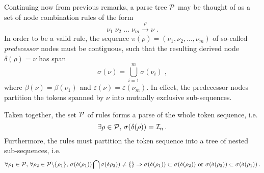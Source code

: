 \documentclass{report}
\begin{document}
Continuing now from previous remarks, a parse tree ${\cal P}$ may be 
thought of as a set of node combination rules of the form
\[
\nu_1\;\nu_2\;...\;\nu_m \stackrel{\rho}{\rightarrow} \nu\;.
\]
In order to be a valid rule, 
the sequence ${\pi}(\rho)=(\nu_1,\nu_2,...,\nu_m)$ of 
so-called {\em predecessor} nodes must be contiguous, such that the 
resulting derived node $\delta(\rho)=\nu$ has span
\[
\sigma(\nu)=\bigcup_{i=1}^{m}\sigma(\nu_i)\;,
\]
where $\beta(\nu)=\beta(\nu_1)$ and 
$\varepsilon(\nu)=\varepsilon(\nu_m)$.
In effect, the predecessor nodes partition the 
tokens spanned by $\nu$ into mutually exclusive sub-sequences.

Taken together, the set ${\cal P}$ of rules forms a parse
of the whole token sequence, i.e.
\[
\exists\rho\in{\cal P},\,\sigma(\delta(\rho)) = {\cal I}_n\,.
\]
Furthermore, the rules must
partition the token sequence into a tree of nested sub-sequences, i.e. 
\[
\forall \rho_1\in{\cal P},\,
\forall \rho_2\in{\cal P}\backslash\{\rho_1\}
,\,
\sigma(\delta(\rho_1))\bigcap\sigma(\delta\rho_2))\ne\{\}
\Rightarrow\sigma(\delta(\rho_1))\subset
\sigma(\delta(\rho_2))\mbox{ or }
\sigma(\delta(\rho_2))\subset\sigma(\delta(\rho_1))\,.
\]
\end{document}
